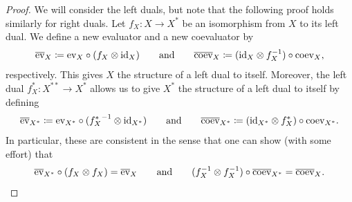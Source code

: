 \noindent\begin{proof} We will consider the left duals, but note that the following proof holds similarly for right duals. Let $f_X : X \to X^*$ be an isomorphism from $X$ to its left dual. We define a new evaluator and a new coevaluator by
\begin{align*}
\begin{split}
\overline{\textup{ev}}_X \coloneqq \textup{ev}_X \circ (f_X \otimes \textup{id}_X)\qquad\text{and}\qquad\overline{\textup{coev}}_X \coloneqq (\textup{id}_X \otimes f_X^{-1}) \circ \textup{coev}_X,
\end{split}
\end{align*}
\noindent respectively. This gives $X$ the structure of a left dual to itself. Moreover, the left dual $f_X^* : X^{**} \to X^*$ allows us to give $X^*$ the structure of a left dual to itself by defining
\begin{align*}
\begin{split}
\overline{\textup{ev}}_{X^*} \coloneqq \textup{ev}_{X^*} \circ ({f_X^*}^{-1} \otimes \textup{id}_{X^*})\qquad\text{and}\qquad\overline{\textup{coev}}_{X^*} \coloneqq (\textup{id}_{X^*} \otimes f_X^*) \circ \textup{coev}_{X^*}.
\end{split}
\end{align*}
\noindent In particular, these are consistent in the sense that one can show (with some effort) that
\begin{align*}
\begin{split}
\overline{\textup{ev}}_{X^*}\circ (f_X \otimes f_X) = \overline{\textup{ev}}_X \qquad\text{and}\qquad(f_X^{-1} \otimes f_X^{-1}) \circ \overline{\textup{coev}}_{X^*} = \overline{\textup{coev}}_X.
\end{split}
\end{align*}
\noindent %
\end{proof}\\

